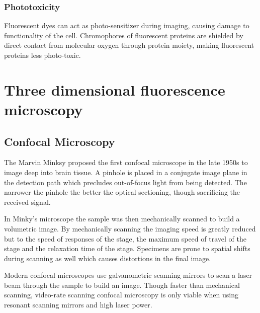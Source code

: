 \subsubsection{Phototoxicity}

Fluorescent dyes can act as photo-sensitizer during imaging, causing damage to functionality of the cell.
Chromophores of fluorescent proteins are shielded by direct contact from molecular oxygen through protein moiety, making fluorescent proteins less photo-toxic.


\section{Three dimensional fluorescence microscopy}
\subsection{Confocal Microscopy}

The Marvin Minksy proposed the first confocal microscope in the late 1950s to image deep into brain tissue.
A pinhole is placed in a conjugate image plane in the detection path which precludes out-of-focus light from being detected.
The narrower the pinhole the better the optical sectioning, though sacrificing the received signal.

In Minky's microscope the sample was then mechanically scanned to build a volumetric image.
By mechanically scanning the imaging speed is greatly reduced but to the speed of responses of the stage, the maximum speed of travel of the stage and the relaxation time of the stage.
Specimens are prone to spatial shifts during scanning as well which causes distortions in the final image.

Modern confocal microscopes use galvanometric scanning mirrors to scan a laser beam through the sample to build an image.
Though faster than mechanical scanning, video-rate scanning confocal microscopy is only viable when using resonant scanning mirrors and high laser power.

%

